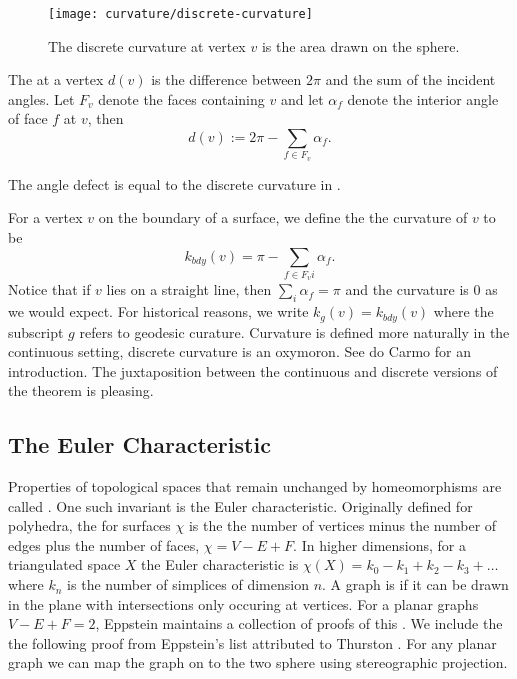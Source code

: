 \begin{figure}[htb]
\centering
\texttt{[image: curvature/discrete-curvature]}
\caption{The discrete curvature at vertex $v$ is the area drawn on the sphere.}
\label{fig:discrete-curvature}
\end{figure}

The  at a vertex $d(v)$ is the difference between $2\pi$ and
the sum of the incident angles.  Let $F_v$ denote the faces containing $v$  
and let $\alpha_f$  denote the interior  angle of face $f$ at $v$, then
$$d(v):=2\pi -\sum_{f\in F_v}\alpha_f.$$

The angle defect is equal to the discrete curvature in .


For a vertex $v$ on the boundary of a surface, we define the the curvature
of $v$  to be 
$$k_{bdy}(v)= \pi-\sum_{f\in F_vi}\alpha_f.$$
Notice that if $v$ lies on a straight line, then $\sum_{i}\alpha_f=\pi$
and the curvature is $0$ as we would expect.
For historical reasons,  we write $k_g(v)=k_{bdy}(v)$
where the subscript $g$ refers to geodesic curature.
Curvature is defined more naturally in the continuous setting,
discrete curvature is an oxymoron.  See do Carmo \cite{doc76} for an introduction.
The juxtaposition between the continuous and discrete versions of the theorem
is pleasing.





\subsection{The Euler Characteristic}

Properties of topological spaces that remain unchanged by homeomorphisms are called
. One such invariant is the Euler characteristic.
Originally defined for polyhedra, the  for surfaces $\chi$ is the 
the number of vertices minus the number of edges plus  the number of faces, $\chi=V-E+F.$
In higher dimensions, for a triangulated space $X$ the Euler characteristic is 
$\chi(X)=k_0-k_1+k_2-k_3+\ldots$ where $k_n$ is the number of simplices of dimension $n.$
A  graph  is  if it can be drawn in the plane with intersections only occuring
at vertices.
For a planar graphs $V-E+F=2$, Eppstein maintains a collection of proofs of this \cite{eppstein-proofs}.
We include the the following proof from Eppstein's list attributed to Thurston
 \cite{thurston}. For any planar graph we can map the graph on to the two sphere
 using stereographic projection.
 
